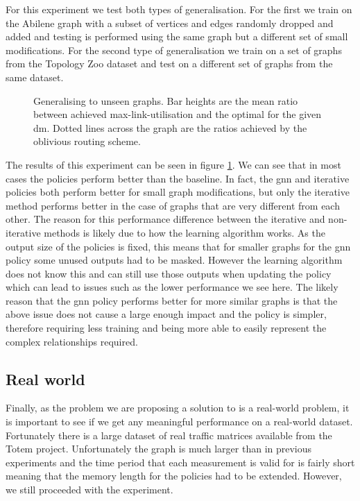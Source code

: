 For this experiment we test both types of generalisation. For the first we train on the Abilene graph with a subset of vertices and edges randomly dropped and added and testing is performed using the same graph but a different set of small modifications. For the second type of generalisation we train on a set of graphs from the Topology Zoo dataset and test on a different set of graphs from the same dataset.

\begin{figure}
    \centering
    
    \caption{Generalising to unseen graphs. Bar heights are the mean ratio between achieved max-link-utilisation and the optimal for the given \ac{dm}. Dotted lines across the graph are the ratios achieved by the oblivious routing scheme.}
    \label{fig:exp_graphs}
\end{figure}

The results of this experiment can be seen in figure \ref{fig:exp_graphs}. We can see that in most cases the policies perform better than the baseline. In fact, the \ac{gnn} and iterative policies both perform better for small graph modifications, but only the iterative method performs better in the case of graphs that are very different from each other. The reason for this performance difference between the iterative and non-iterative methods is likely due to how the learning algorithm works. As the output size of the policies is fixed, this means that for smaller graphs for the \ac{gnn} policy some unused outputs had to be masked. However the learning algorithm does not know this and can still use those outputs when updating the policy which can lead to issues such as the lower performance we see here. The likely reason that the \ac{gnn} policy performs better for more similar graphs is that the above issue does not cause a large enough impact and the policy is simpler, therefore requiring less training and being more able to easily represent the complex relationships required.

\subsection{Real world}
Finally, as the problem we are proposing a solution to is a real-world problem, it is important to see if we get any meaningful performance on a real-world dataset. Fortunately there is a large dataset of real traffic matrices available from the Totem\cite{uhlig2006providing} project. Unfortunately the graph is much larger than in previous experiments and the time period that each measurement is valid for is fairly short meaning that the memory length for the policies had to be extended. However, we still proceeded with the experiment.

